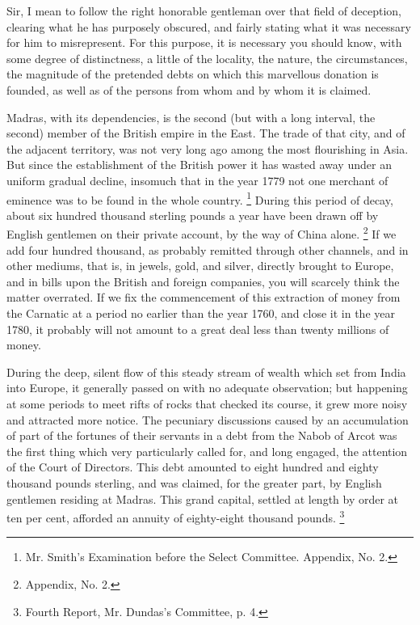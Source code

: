 Sir, I mean to follow the right honorable gentleman over that field of deception, clearing what he has purposely obscured, and fairly stating what it was necessary for him to misrepresent. For this purpose, it is necessary you should know, with some degree of distinctness, a little of the locality, the nature, the circumstances, the magnitude of the pretended debts on which this marvellous donation is founded, as well as of the persons from whom and by whom it is claimed.

Madras, with its dependencies, is the second (but with a long interval, the second) member of the British empire in the East. The trade of that city, and of the adjacent territory, was not very long ago among the most flourishing in Asia. But since the establishment of the British power it has wasted away under an uniform gradual decline, insomuch that in the year 1779 not one merchant of eminence was to be found in the whole country.
\footnote{ Mr. Smith's Examination before the Select Committee. Appendix, No. 2.}
 During this period of decay, about six hundred thousand sterling pounds a year have been drawn off by English gentlemen on their private account, by the way of China alone.
\footnote{ Appendix, No. 2.}
 If we add four hundred thousand, as probably remitted through other channels, and in other mediums, that is, in jewels, gold, and silver, directly brought to Europe, and in bills upon the British and foreign companies, you will scarcely think the matter overrated. If we fix the commencement of this extraction of money from the Carnatic at a period no earlier than the year 1760, and close it in the year 1780, it probably will not amount to a great deal less than twenty millions of money.

During the deep, silent flow of this steady stream of wealth which set from India into Europe, it generally passed on with no adequate observation; but happening at some periods to meet rifts of rocks that checked its course, it grew more noisy and attracted more notice. The pecuniary discussions caused by an accumulation of part of the fortunes of their servants in a debt from the Nabob of Arcot was the first thing which very particularly called for, and long engaged, the attention of the Court of Directors. This debt amounted to eight hundred and eighty thousand pounds sterling, and was claimed, for the greater part, by English gentlemen residing at Madras. This grand capital, settled at length by order at ten per cent, afforded an annuity of eighty-eight thousand pounds.
\footnote{ Fourth Report, Mr. Dundas's Committee, p. 4.}


